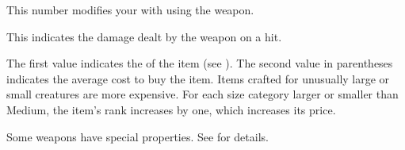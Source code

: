      This number modifies your  with  using the weapon.

     This  indicates the damage dealt by the weapon on a hit.

     The first value indicates the  of the item (see ).
    The second value in parentheses indicates the average cost to buy the item.
    Items crafted for unusually large or small creatures are more expensive.
    For each size category larger or smaller than Medium, the item's rank increases by one, which increases its price.

     Some weapons have special properties. See  for details.

